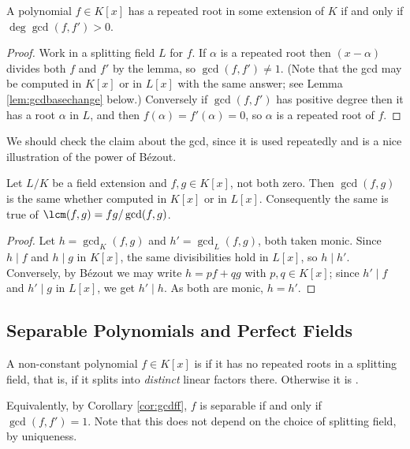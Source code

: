 \begin{corollary}\label{cor:gcdff}
	A polynomial $f \in K[x]$ has a repeated root in some extension of $K$ if and only if $\deg\gcd(f,f') > 0$.
\end{corollary}

\begin{proof}
	Work in a splitting field $L$ for $f$. If $\alpha$ is a repeated root then $(x-\alpha)$ divides both $f$ and $f'$ by the lemma, so $\gcd(f,f') \neq 1$. (Note that the gcd may be computed in $K[x]$ or in $L[x]$ with the same answer; see Lemma \ref{lem:gcdbasechange} below.) Conversely if $\gcd(f,f')$ has positive degree then it has a root $\alpha$ in $L$, and then $f(\alpha) = f'(\alpha) = 0$, so $\alpha$ is a repeated root of $f$.
\end{proof}

We should check the claim about the gcd, since it is used repeatedly and is a nice illustration of the power of B\'ezout.

\begin{lemma}\label{lem:gcdbasechange}
	Let $L/K$ be a field extension and $f, g \in K[x]$, not both zero. Then $\gcd(f,g)$ is the same whether computed in $K[x]$ or in $L[x]$. Consequently the same is true of $\lcm(f,g) = fg/\gcd(f,g)$.
\end{lemma}

\begin{proof}
	Let $h = \gcd_K(f,g)$ and $h' = \gcd_L(f,g)$, both taken monic. Since $h \mid f$ and $h \mid g$ in $K[x]$, the same divisibilities hold in $L[x]$, so $h \mid h'$. Conversely, by B\'ezout we may write $h = pf + qg$ with $p, q \in K[x]$; since $h' \mid f$ and $h' \mid g$ in $L[x]$, we get $h' \mid h$. As both are monic, $h = h'$.
\end{proof}

\subsection{Separable Polynomials and Perfect Fields}

\begin{definition}
	A non-constant polynomial $f \in K[x]$ is  if it has no repeated roots in a splitting field, that is, if it splits into \emph{distinct} linear factors there. Otherwise it is .
\end{definition}

Equivalently, by Corollary \ref{cor:gcdff}, $f$ is separable if and only if $\gcd(f,f') = 1$. Note that this does not depend on the choice of splitting field, by uniqueness.

